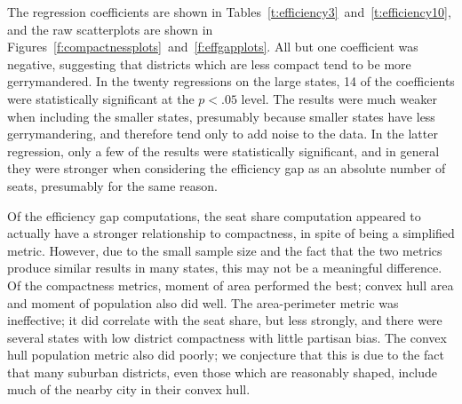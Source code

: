 \documentclass[12pt]{article}
\begin{document}
  The regression coefficients are shown in Tables~\ref{t:efficiency3}~and~\ref{t:efficiency10}, and the raw scatterplots are shown in Figures~\ref{f:compactnessplots}~and~\ref{f:effgapplots}.  All but one coefficient was negative, suggesting that districts which are less compact tend to be more gerrymandered.  In the twenty regressions on the large states, 14 of the coefficients were statistically significant at the $p<.05$ level.  The results were much weaker when including the smaller states, presumably because smaller states have less gerrymandering, and therefore tend only to add noise to the data.  In the latter regression, only a few of the results were statistically significant, and in general they were stronger when considering the efficiency gap as an absolute number of seats, presumably for the same reason.
  
  Of the efficiency gap computations, the seat share computation appeared to actually have a stronger relationship to compactness, in spite of being a simplified metric.  However, due to the small sample size and the fact that the two metrics produce similar results in many states, this may not be a meaningful difference.  Of the compactness metrics, moment of area performed the best; convex hull area and moment of population also did well.  The area-perimeter metric was ineffective; it did correlate with the seat share, but less strongly, and there were several states with low district compactness with little partisan bias.  The convex hull population metric also did poorly; we conjecture that this is due to the fact that many suburban districts, even those which are reasonably shaped, include much of the nearby city in their convex hull.
\end{document}
